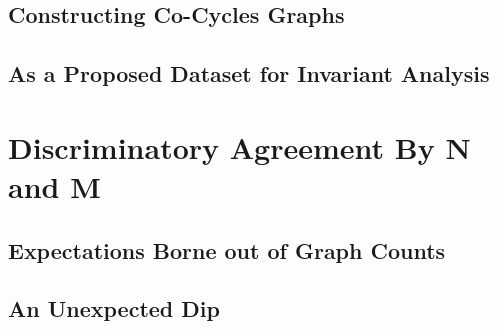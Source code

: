\subsection{Constructing Co-Cycles Graphs}
\subsection{As a Proposed Dataset for Invariant Analysis}

\section{Discriminatory Agreement By N and M}
\subsection{Expectations Borne out of Graph Counts}
\subsection{An Unexpected Dip}